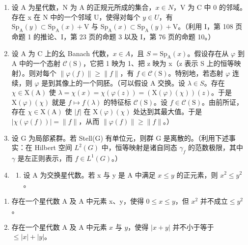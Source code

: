 \begin{enumerate}
\def\labelenumi{\arabic{enumi})}
\setcounter{enumi}{11}
\item
  设 A 为星代数，N 为 A 的正规元所成的集合，\(x \in N\)，V 为 C 中 0 的邻域。存在 x 在 N 中的一个邻域 U，使得对每个 \(y \in U\)，有 \(\mathrm{Sp}_{\mathrm{A}}(y) \subset \mathrm{Sp}_{\mathrm{A}}(x) + \mathrm{V}\) 与 \(\mathrm{Sp}_{\mathrm{A}}(x) \subset \mathrm{Sp}_{\mathrm{A}}(y) + \mathrm{V}\)。（利用 I，第 108 页命题 1 的推论、I，第 23 页的命题 3 以及 I，第 76 页的命题 10。）
\item
  设 A 为 C 上的幺 Banach 代数，\(x \in A\)，且 \(S = \mathrm{Sp}_{\mathrm{A}}(x)\)。假设存在从 \(\varphi\) 到 A 中的一个态射 \(\mathcal{C}(\mathrm{S})\)，它把 1 映为 1、把 z 映为 x（z 表示 S 上的恒等映射）。则对每个 \(\|\varphi(f)\| \geqslant \|f\|\)，有 \(f \in \mathcal{C}(\mathrm{S})\)。特别地，若态射 \(\varphi\) 连续，则 \(\varphi\) 是到其像上的一个同胚。（可以假设 A 交换。设 \(\lambda \in S\)。存在 \(\chi \in \mathrm{X}(\mathrm{A})\) 使 \(\lambda = \chi(x) = \chi(\varphi(z)) = (\mathrm{X}(\varphi)(\chi))(z)\)。于是 \(\mathrm{X}(\varphi)(\chi)\) 就是 \(f \mapsto f(\lambda)\) 的特征标 \(\mathcal{C}(\mathrm{S})\)。设 \(f \in \mathcal{C}(\mathrm{S})\)。由前所证，存在 \(\chi \in \mathrm{X}(\mathrm{A})\) 使 \(|f|\) 在 \(\mathrm{X}(\varphi)(\chi)\) 处达到其最大值。于是 \(|\chi(\varphi(f))| = \|f\|\)，从而 \(\|\varphi(f)\| \geqslant \|f\|\)。）
\item
  设 G 为局部紧群。若 Stell(G) 有单位元，则群 G 是离散的。（利用下述事实：在 Hilbert 空间 \(L^{2}(G)\) 中，恒等映射是诸自同态 \(\gamma_{f}\) 的范数极限，其中 \(\gamma\) 是左正则表示，而 \(f \in L^{1}(G)\)。）
\item
  \begin{enumerate}
  \def\labelenumii{\alph{enumii})}
  \tightlist
  \item
    设 A 为交换星代数。若 x 与 y 是 A 中满足 \(x \leqslant y\) 的正元素，则 \(x^{2} \leqslant y^{2}\)。
  \end{enumerate}
\end{enumerate}

\begin{enumerate}
\def\labelenumi{\alph{enumi})}
\setcounter{enumi}{1}
\item
  存在一个星代数 A 及 A 中元素 x、y，使得 \(0 \leqslant x \leqslant y\)，但 \(x^{2}\) 并不成立\(\leqslant y^{2}\)。
\item
  存在一个星代数 A 及 A 中元素 \(x\) 与 \(y\)，使得 \(|x + y|\) 并不小于等于 \(\leqslant |x| + |y|\)。
\end{enumerate}

